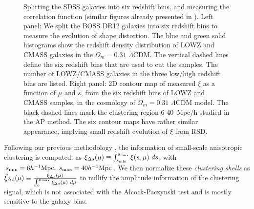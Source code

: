 \documentclass[prl,twocolumn,superscriptaddress,aps,amsmath,amssymb,nofootinbib,altaffilletter]{revtex4}
\begin{document}
\begin{figure}
   \caption{\label{fig_TpCF}
   Splitting the SDSS galaxies into six redshift bins, and measuring the correlation function
   (similar figures already presented in \cite{Li2016}).
   Left panel: We split the BOSS DR12 galaxies into six redshift bins to measure the evolution of shape distortion.
   The blue and green solid histograms show the redshift density distribution of LOWZ and CMASS galaxies in the $\Omega_m=0.31$ $\Lambda$CDM. 
   The vertical dashed lines define the six redshift bins that are used to cut the samples.
   The number of LOWZ/CMASS galaxies in the three low/high redshift bins are listed.
   Right panel: 2D contour map of measured $\xi$ as a function of $\mu$ and $s$, from the six redshift bins of LOWZ and CMASS samples, 
      in the cosmology of $\Omega_m=0.31$ $\Lambda$CDM model.
    The black dashed lines mark the clustering region 6-40\ Mpc/h studied in the AP method.
    The six contour maps have rather similar appearance, implying small redshift evolution of $\xi$ from RSD.
   }
\end{figure}

Following our previous methodology \citep{Li2016}, the information of small-scale anisotropic clustering is computed.
as $\xi_{\Delta s} (\mu) \equiv \int_{s_{\rm min}}^{s_{\rm max}} \xi (s,\mu)\ ds$, 
with $s_{\rm min}=6 h^{-1} {\rm Mpc},\ s_{\rm max}=40 h^{-1} {\rm Mpc}$.
We then normalize these {\em clustering shells} as 
$\hat\xi_{\Delta s}(\mu) \equiv \frac{\xi_{\Delta s}(\mu)}{\int_{0}^{\mu_{\rm max}}\xi_{\Delta s}(\mu)\ d\mu}$
to nullify the amplitude information of the clustering signal, 
which is not associated with the Alcock-Paczynski test and is mostly sensitive to the galaxy bias.
\end{document}
